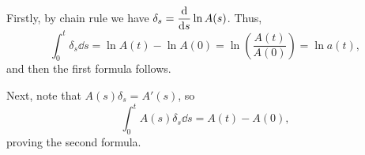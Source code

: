 \begin{enumerate}
\begin{pf}
Firstly, by chain rule we have \(\displaystyle \delta_s=\dv{}{s}\ln A(s)\).
Thus,
\[
\int_{0}^{t}\delta_s\dd{s}=\ln A(t)-\ln A(0)=\ln(\frac{A(t)}{A(0)})=\ln a(t),
\]
and then the first formula follows.

Next, note that \(A(s)\delta_s=A'(s)\), so
\[
\int_{0}^{t}A(s)\delta_s\dd{s}=A(t)-A(0),
\]
proving the second formula.
\end{pf}
\end{enumerate}
